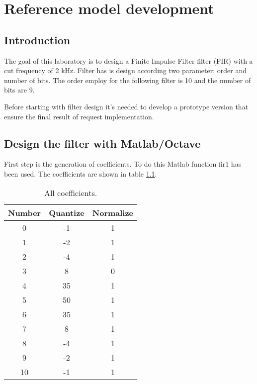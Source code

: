 %
\chapter{Reference model development}
\label{chap1}


\section{Introduction}

The goal of this laboratory is to design a Finite Impulse Filter filter (FIR) with a cut frequency of 2 kHz.
Filter has is design according two parameter: order and number of bits. The order employ for the following filter
is 10 and the number of bits are 9.

Before starting with filter design it's needed to develop a prototype version that ensure the final 
result of request implementation.

\section{Design the filter with Matlab/Octave}

First step is the generation of coefficients. To do this Matlab function fir1 has been used.
The coefficients are shown in table \ref{tab:1}. %

\begin{table}[ht]
\centering
\begin{tabular}{c|c|c}
\toprule
Number & Quantize & Normalize \\
\midrule
0 & -1 & 1 \\
1 & -2 & 1 \\
2 & -4 & 1 \\
3 & 8 & 0 \\
4 & 35 & 1 \\
5 & 50 & 1 \\
6 & 35 & 1 \\
7 & 8 & 1 \\
8 & -4 & 1 \\
9 & -2 & 1 \\
10 & -1 & 1 \\
\bottomrule
\end{tabular}
\caption{All coefficients.}
\label{tab:1}
\end{table}

